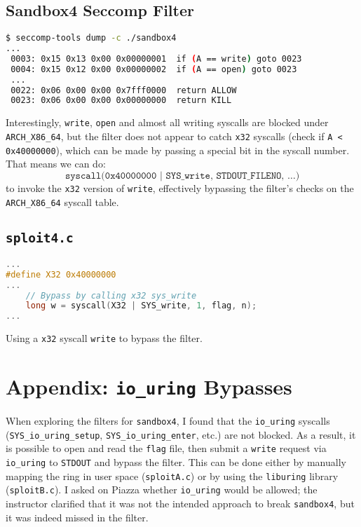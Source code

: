 \documentclass[11pt]{article}
\begin{document}
\subsection{Sandbox4 Seccomp Filter}
\begin{lstlisting}[language=bash]
$ seccomp-tools dump -c ./sandbox4
...
 0003: 0x15 0x13 0x00 0x00000001  if (A == write) goto 0023
 0004: 0x15 0x12 0x00 0x00000002  if (A == open) goto 0023
 ...
 0022: 0x06 0x00 0x00 0x7fff0000  return ALLOW
 0023: 0x06 0x00 0x00 0x00000000  return KILL
\end{lstlisting}

Interestingly, \texttt{write}, \texttt{open} and almost all writing syscalls are blocked under \texttt{ARCH\_X86\_64}, but the filter
does not appear to catch \texttt{x32} syscalls (check if \texttt{A < 0x40000000}), which can be made by passing a special bit in the syscall number. That means we can do:
\[
    \texttt{syscall(0x40000000 | SYS\_write, STDOUT\_FILENO, \ldots)}
\]
to invoke the \texttt{x32} version of \texttt{write}, effectively bypassing the filter's checks on the
\texttt{ARCH\_X86\_64} syscall table.

\subsection{\texttt{sploit4.c}}
\begin{lstlisting}[language=C]
...
#define X32 0x40000000
...
    // Bypass by calling x32 sys_write
    long w = syscall(X32 | SYS_write, 1, flag, n);
...
\end{lstlisting}
Using a \texttt{x32} syscall \texttt{write} to bypass the filter.

\section{Appendix: \texttt{io\_uring} Bypasses}
\label{sec:io_uring}

When exploring the filters for \texttt{sandbox4}, I found that the
\texttt{io\_uring} syscalls (\texttt{SYS\_io\_uring\_setup}, \texttt{SYS\_io\_uring\_enter}, etc.) are not
blocked. As a result, it is possible to open and read the \texttt{flag} file, then submit a \texttt{write} request
via \texttt{io\_uring} to \texttt{STDOUT} and bypass the filter. This can be done either by manually mapping
the ring in user space (\texttt{sploitA.c}) or by using the \texttt{liburing} library (\texttt{sploitB.c}).
I asked on Piazza whether \texttt{io\_uring} would be allowed; the instructor clarified that it was not
the intended approach to break \texttt{sandbox4}, but it was indeed missed in the filter.
\end{document}
